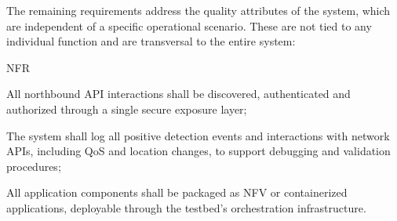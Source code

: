 The remaining requirements address the quality attributes of the system, which are independent of a specific operational scenario. These are not tied to any individual function and are transversal to the entire system:

\begin{custenumerate}{NFR}
    \setcounter{enumi}{5}
    \item \label{enum:nfr:secure-exposure} All northbound \acs{API} interactions shall be discovered, authenticated and authorized through a single secure exposure layer;
    \item \label{enum:nfr:logging} The system shall log all positive detection events and interactions with network \acsp{API}, including \acs{QoS} and location changes, to support debugging and validation procedures;
    \item \label{enum:nfr:packaging} All application components shall be packaged as \acs{NFV} or containerized applications, deployable through the testbed's orchestration infrastructure.
\end{custenumerate}
